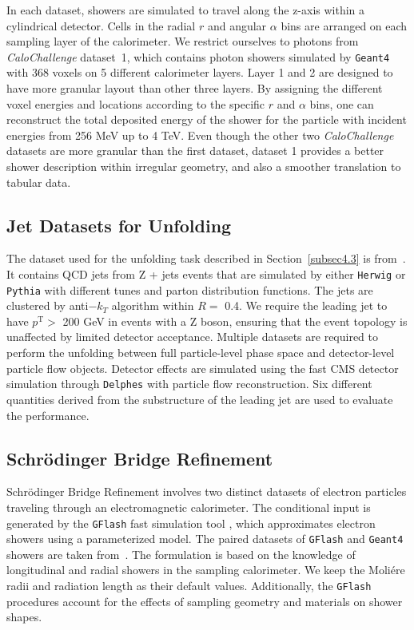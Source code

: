 \documentclass[%
 reprint,
 amsmath,amssymb,
 aps,
prd,
floatfix,
]{revtex4-2}
\begin{document}
In each dataset, showers are simulated to travel along the z-axis within a cylindrical detector. Cells in the radial $r$ and angular $\alpha$ bins are arranged on each sampling layer of the calorimeter. We restrict ourselves to photons from \textit{CaloChallenge} dataset~1, which contains photon showers simulated by \verb+Geant4+ with 368 voxels on 5 different calorimeter layers. Layer 1 and 2 are designed to have more granular layout than other three layers. By assigning the different voxel energies and locations according to the specific $r$ and $\alpha$ bins, one can reconstruct the total deposited energy of the shower for the particle with incident energies from 256 MeV up to 4 TeV. Even though the other two \textit{CaloChallenge} datasets are more granular than the first dataset, dataset 1 provides a better shower description within irregular geometry, and also a smoother translation to tabular data.

\subsection{Jet Datasets for Unfolding}\label{subsec3.3}

The dataset used for the unfolding task described in Section~\ref{subsec4.3} is from~\cite{omnifold,omnifold_zenodo}. It contains QCD jets from Z + jets events that are simulated by either \verb+Herwig+ \cite{herwig} or \verb+Pythia+ with different tunes and parton distribution functions. The jets are clustered by anti$-k_T$ algorithm within $R =$ 0.4. We require the leading jet to have $p^\mathrm{T} >$ 200 GeV in events with a Z boson, ensuring that the event topology is unaffected by limited detector acceptance. Multiple datasets are required to perform the unfolding between full particle-level phase space and detector-level particle flow objects. Detector effects are simulated using the fast CMS detector simulation through \verb+Delphes+ \cite{delphes} with particle flow reconstruction. Six different quantities derived from the substructure of the leading jet are used to evaluate the performance.

\subsection{Schr{\"o}dinger Bridge Refinement}\label{subsec3.4}

Schr{\"o}dinger Bridge Refinement involves two distinct datasets of electron particles traveling through an electromagnetic calorimeter. The conditional input is generated by the \verb+GFlash+ fast simulation tool \cite{gflash1,gflash2}, which approximates electron showers using a parameterized model. The paired datasets of \verb+GFlash+ and \verb+Geant4+ showers are taken from~\cite{sbrefine,gflash_zenodo}. The formulation is based on the knowledge of longitudinal and radial showers in the sampling calorimeter. We keep the Moli{\'e}re radii and radiation length as their default values. Additionally, the \verb+GFlash+ procedures account for the effects of sampling geometry and materials on shower shapes.
\end{document}
